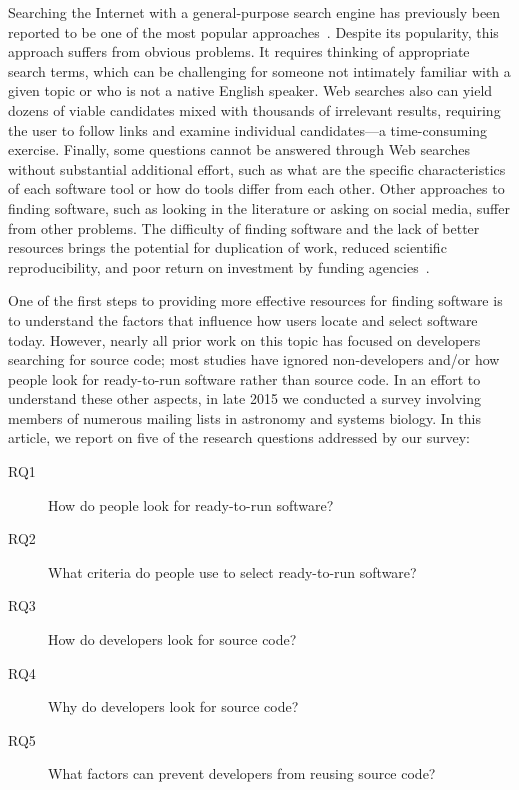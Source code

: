 \documentclass[review]{elsarticle}
\begin{document}
Searching the Internet with a general-purpose search engine has previously been reported to be one of the most popular approaches~\citep{samadi_2004, umarji_2008}.  Despite its popularity, this approach suffers from obvious problems.  It requires thinking of appropriate search terms, which can be challenging for someone not intimately familiar with a given topic or who is not a native English speaker.  Web searches also can yield dozens of viable candidates mixed with thousands of irrelevant results, requiring the user to follow links and examine individual candidates---a time-consuming exercise.  Finally, some questions cannot be answered through Web searches without substantial additional effort, such as what are the specific characteristics of each software tool or how do tools differ from each other.  Other approaches to finding software, such as looking in the literature or asking on social media, suffer from other problems.  The difficulty of finding software and the lack of better resources brings the potential for duplication of work, reduced scientific reproducibility, and poor return on investment by funding agencies~\citep{cannata_2005, national2003sharing, crook2013learning, poisot2015best, white2014nih, niemeyer2016challenge}.

One of the first steps to providing more effective resources for finding software is to understand the factors that influence how users locate and select software today.  However, nearly all prior work on this topic has focused on developers searching for source code; most studies have ignored non-developers and/or how people look for ready-to-run software rather than source code.  In an effort to understand these other aspects, in late 2015 we conducted a survey involving members of numerous mailing lists in astronomy and systems biology.  In this article, we report on five of the research questions addressed by our survey:

\begin{description}

\item[RQ1] How do people look for ready-to-run software?
\item[RQ2] What criteria do people use to select ready-to-run software?
\item[RQ3] How do developers look for source code?
\item[RQ4] Why do developers look for source code?
\item[RQ5] What factors can prevent developers from reusing source code?

\end{description}
\end{document}
